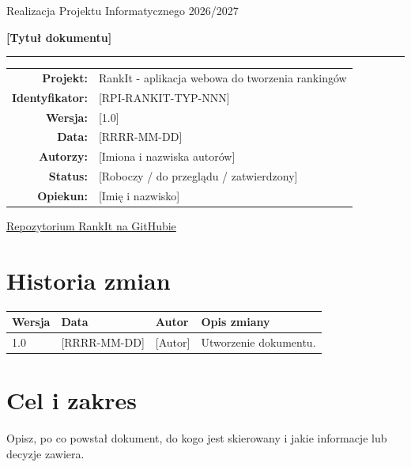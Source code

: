 \documentclass[11pt,a4paper]{article}
\newcommand{\DocTitle}{[Tytuł dokumentu]}
\newcommand{\DocId}{[RPI-RANKIT-TYP-NNN]}
\newcommand{\DocVersion}{[1.0]}
\newcommand{\DocDate}{[RRRR-MM-DD]}
\newcommand{\DocAuthors}{[Imiona i nazwiska autorów]}
\newcommand{\DocStatus}{[Roboczy / do przeglądu / zatwierdzony]}
\begin{document}
\begin{titlepage}
  \centering
  \vspace*{2cm}
  {\Huge\RankItWordmark\par}
  \vspace{0.8cm}
  {\Large Realizacja Projektu Informatycznego 2026/2027\par}
  \vspace{1.8cm}
  {\huge\bfseries\color{RankItNavy}\DocTitle\par}
  \vspace{0.6cm}
  {\color{RankItTeal}\rule{0.72\textwidth}{1.5pt}\par}
  \vspace{1.2cm}
  \begin{tabular}{rl}
    \textbf{Projekt:} & RankIt - aplikacja webowa do tworzenia rankingów \\
    \textbf{Identyfikator:} & \DocId \\
    \textbf{Wersja:} & \DocVersion \\
    \textbf{Data:} & \DocDate \\
    \textbf{Autorzy:} & \DocAuthors \\
    \textbf{Status:} & \DocStatus \\
    \textbf{Opiekun:} & [Imię i nazwisko] \\
  \end{tabular}
  \vfill
  {\small\href{https://github.com/elprofesoriqo/rpi}{Repozytorium RankIt na GitHubie}\par}
\end{titlepage}
\setcounter{page}{2}

\section{Historia zmian}
\begin{tabularx}{\textwidth}{p{}p{}p{}X}
  \toprule
  \textbf{Wersja} & \textbf{Data} & \textbf{Autor} & \textbf{Opis zmiany} \\
  \midrule
  1.0 & [RRRR-MM-DD] & [Autor] & Utworzenie dokumentu. \\
  \bottomrule
\end{tabularx}

\section{Cel i zakres}
Opisz, po co powstał dokument, do kogo jest skierowany i jakie informacje lub decyzje zawiera.
\end{document}
